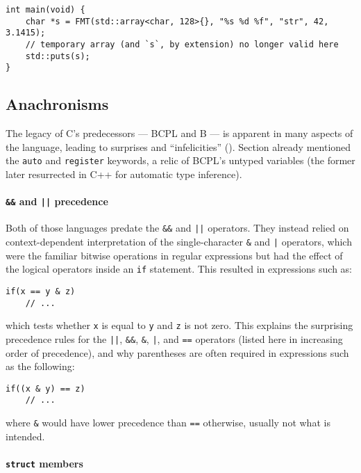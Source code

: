 \begin{lstlisting}[style=c++]
int main(void) {
    char *s = FMT(std::array<char, 128>{}, "%s %d %f", "str", 42, 3.1415);
    // temporary array (and `s`, by extension) no longer valid here
    std::puts(s);
}
\end{lstlisting}

\subsection{Anachronisms}

The legacy of C's predecessors --- BCPL and B --- is apparent in many aspects of
the language, leading to surprises and ``infelicities'' (\cite{Ritchie1996}).
Section  already mentioned the \texttt{auto} and
\texttt{register} keywords, a relic of BCPL's untyped variables (the former
later resurrected in C++ for automatic type inference).

\paragraph{\texttt{\&\&} and \texttt{||} precedence}

Both of those languages predate the \texttt{\&\&} and \texttt{||} operators.
They instead relied on context-dependent interpretation of the single-character
\texttt{\&} and \texttt{|} operators, which were the familiar bitwise operations
in regular expressions but had the effect of the logical operators inside an
\texttt{if} statement.  This resulted in expressions such as:

\begin{lstlisting}[style=c]
if(x == y & z)
    // ...
\end{lstlisting}

which tests whether \texttt{x} is equal to \texttt{y} and \texttt{z} is not
zero.  This explains the surprising precedence rules for the \texttt{||},
\texttt{\&\&}, \texttt{\&}, \texttt{|}, and \texttt{==} operators (listed here
in increasing order of precedence), and why parentheses are often required in
expressions such as the following:

\begin{lstlisting}[style=c]
if((x & y) == z)
    // ...
\end{lstlisting}

where \texttt{\&} would have lower precedence than \texttt{==} otherwise,
usually not what is intended.

\paragraph{\texttt{struct} members}

